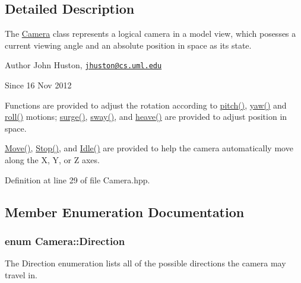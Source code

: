 \subsection{\-Detailed \-Description}
\-The \hyperlink{class_camera}{\-Camera} class represents a logical camera in a model view, which posesses a current viewing angle and an absolute position in space as its state. 

\begin{DoxyAuthor}{\-Author}
\-John \-Huston, \href{mailto:jhuston@cs.uml.edu}{\tt jhuston@cs.\-uml.\-edu} 
\end{DoxyAuthor}
\begin{DoxySince}{\-Since}
16 \-Nov 2012
\end{DoxySince}
\-Functions are provided to adjust the rotation according to \hyperlink{class_camera_ade9b499340749c916d6ffeeadd7296d4}{pitch()}, \hyperlink{class_camera_aea440eca8100cae6ffcc6ca915733795}{yaw()} and \hyperlink{class_camera_a6a0a10b821c733f380cc82aff09d9498}{roll()} motions; \hyperlink{class_camera_abb2251df65445bf8efd3fe0074fb5033}{surge()}, \hyperlink{class_camera_abbe6fe82ed05e64e35b0c4ed2001b34e}{sway()}, and \hyperlink{class_camera_a2148d751f104d8e39c9832e2372df2d9}{heave()} are provided to adjust position in space.

\hyperlink{class_camera_a421e03f93824e178d6e77ff547cd290e}{\-Move()}, \hyperlink{class_camera_adf064f765f610684e0675bd67de013fd}{\-Stop()}, and \hyperlink{class_camera_aec3559fe43597656629fdb00157d3c73}{\-Idle()} are provided to help the camera automatically move along the \-X, \-Y, or \-Z axes. 

\-Definition at line 29 of file \-Camera.\-hpp.



\subsection{\-Member \-Enumeration \-Documentation}
\hypertarget{class_camera_a80cb65605322d27ad3b6d973484509ec}{
\subsubsection[{\-Direction}]{\setlength{\rightskip}{0pt plus 5cm}enum {\bf \-Camera\-::\-Direction}}}\label{class_camera_a80cb65605322d27ad3b6d973484509ec}


\-The \-Direction enumeration lists all of the possible directions the camera may travel in. 


